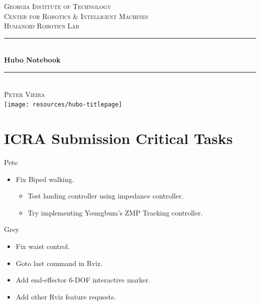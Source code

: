 \documentclass[letterpaper, 10 pt]{report}
\begin{document}
\begin{titlepage}
\center
\textsc{\LARGE Georgia Institute of Technology}\\[1.5cm]
\textsc{\large Center for Robotics \& Intelligent Machines}\\[0.5cm]
\textsc{\large Humanoid Robotics Lab}\\[0.5cm]
\rule{\linewidth}{0.5mm}\\[0.4cm]
{\huge \bfseries Hubo Notebook}\\[0.4cm]
\rule{\linewidth}{0.5mm}\\[1.5cm]
\textsc{\normalsize Peter Vieira}\\[1.5cm]
\texttt{[image: resources/hubo-titlepage]}
\vfill
\end{titlepage}

\section*{ICRA Submission Critical Tasks}
Pete
\begin{itemize}
  \item Fix Biped walking.
  \begin{itemize}
    \item Test landing controller using impedance controller.
    \item Try implementing Youngbum's ZMP Tracking controller.
  \end{itemize}
\end{itemize}
Grey
\begin{itemize}
  \item Fix waist control.
  \item Goto last command in Rviz.
  \item Add end-effector 6-DOF interactive marker.
  \item Add other Rviz feature requests.
\end{itemize}
\end{document}
